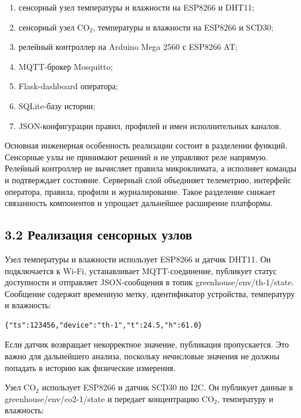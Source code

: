 \documentclass[a4paper,14pt]{extarticle}
\renewcommand{\texttt}[1]{\textnormal{#1}}
\providecommand{\tightlist}{%
  \setlength{\itemsep}{0pt}\setlength{\parskip}{0pt}}
\begin{document}
\begin{enumerate}
\def\labelenumi{\arabic{enumi})}
\tightlist
\item
  сенсорный узел температуры и влажности на ESP8266 и DHT11;
\item
  сенсорный узел CO\(_2\), температуры и влажности на ESP8266 и SCD30;
\item
  релейный контроллер на Arduino Mega 2560 с ESP8266 AT;
\item
  MQTT-брокер Mosquitto;
\item
  Flask-dashboard оператора;
\item
  SQLite-базу истории;
\item
  JSON-конфигурации правил, профилей и имен исполнительных каналов.
\end{enumerate}

Основная инженерная особенность реализации состоит в разделении функций.
Сенсорные узлы не принимают решений и не управляют реле напрямую.
Релейный контроллер не вычисляет правила микроклимата, а исполняет
команды и подтверждает состояние. Серверный слой объединяет телеметрию,
интерфейс оператора, правила, профили и журналирование. Такое разделение
снижает связанность компонентов и упрощает дальнейшее расширение
платформы.

\subsection{3.2 Реализация сенсорных
узлов}\label{ux440ux435ux430ux43bux438ux437ux430ux446ux438ux44f-ux441ux435ux43dux441ux43eux440ux43dux44bux445-ux443ux437ux43bux43eux432}

Узел температуры и влажности использует ESP8266 и датчик DHT11. Он
подключается к Wi-Fi, устанавливает MQTT-соединение, публикует статус
доступности и отправляет JSON-сообщения в топик
\texttt{greenhouse/env/th-1/state}. Сообщение содержит временную метку,
идентификатор устройства, температуру и влажность:

\begin{verbatim}
{"ts":123456,"device":"th-1","t":24.5,"h":61.0}
\end{verbatim}

Если датчик возвращает некорректное значение, публикация пропускается.
Это важно для дальнейшего анализа, поскольку нечисловые значения не
должны попадать в историю как физические измерения.

Узел CO\(_2\) использует ESP8266 и датчик SCD30 по I2C. Он публикует
данные в \texttt{greenhouse/env/co2-1/state} и передает концентрацию
CO\(_2\), температуру и влажность:
\end{document}

